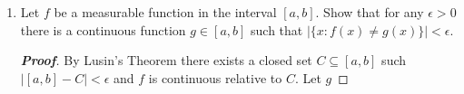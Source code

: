 \documentclass[12pt,leqno]{book}
\theoremstyle{definition}
\newenvironment{Proof}{\begin{proof}[\textnormal{\textbf{Proof}}]}{\end{proof}}
\begin{document}
\begin{enumerate}
\item Let $f$ be a measurable function in the interval $[a,b]$. Show that for any $\epsilon>0$ there is a continuous function $g\in[a,b]$ such that $|\{x:f(x)\not=g(x)\}|<\epsilon$. 
\begin{Proof}
By Lusin's Theorem there exists a closed set $C\subseteq[a,b]$ such $|[a,b]-C|<\epsilon$ and $f$ is continuous relative to $C$. Let $g$
\end{Proof}

\end{enumerate}
\end{document}
